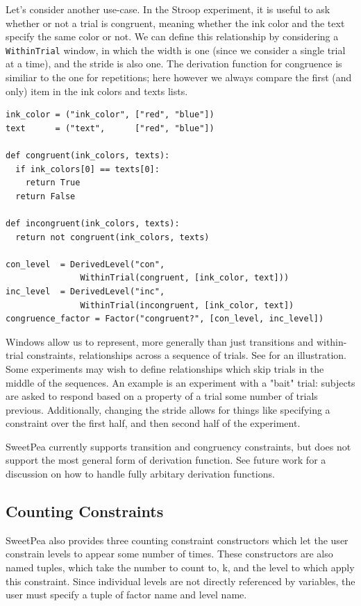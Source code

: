Let's consider another use-case. In the Stroop experiment, it is useful to ask whether or not a trial is congruent, meaning whether the ink color and the text specify the same color or not. We can define this relationship by considering a \texttt{WithinTrial} window, in which the width is one (since we consider a single trial at a time), and the stride is also one. The derivation function for congruence is similiar to the one for repetitions; here however we always compare the first (and only) item in the ink colors and texts lists.

\begin{verbatim}
ink_color = ("ink_color", ["red", "blue"])
text      = ("text",      ["red", "blue"])

def congruent(ink_colors, texts):
  if ink_colors[0] == texts[0]:
    return True
  return False

def incongruent(ink_colors, texts):
  return not congruent(ink_colors, texts)

con_level  = DerivedLevel("con",
               WithinTrial(congruent, [ink_color, text]))
inc_level  = DerivedLevel("inc",
               WithinTrial(incongruent, [ink_color, text])
congruence_factor = Factor("congruent?", [con_level, inc_level])
\end{verbatim}

Windows allow us to represent, more generally than just transitions and within-trial constraints, relationships across a sequence of trials. See  for an illustration. Some experiments may wish to define relationships which skip trials in the middle of the sequences. An example is an experiment with a "bait" trial: subjects are asked to respond based on a property of a trial some number of trials previous. Additionally, changing the stride allows for things like specifying a constraint over the first half, and then second half of the experiment.

SweetPea currently supports transition and congruency constraints, but does not support the most general form of derivation function. See future work for a discussion on how to handle fully arbitary derivation functions.

\subsection{Counting Constraints}
SweetPea also provides three counting constraint constructors which let the user constrain levels to appear some number of times. These constructors are also named tuples, which take the number to count to, k, and the level to which apply this constraint. Since individual levels are not directly referenced by variables, the user must specify a tuple of factor name and level name.

